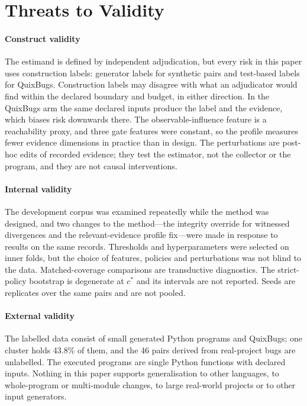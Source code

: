\section{Threats to Validity}\label{sec:threats}

\paragraph*{Construct validity} The estimand is defined by independent adjudication, but every risk in this paper uses construction labels: generator labels for synthetic pairs and test-based labels for QuixBugs. Construction labels may disagree with what an adjudicator would find within the declared boundary and budget, in either direction. In the QuixBugs arm the same declared inputs produce the label and the evidence, which biases risk downwards there. The observable-influence feature is a reachability proxy, and three gate features were constant, so the profile measures fewer evidence dimensions in practice than in design. The \ers{} perturbations are post-hoc edits of recorded evidence; they test the estimator, not the collector or the program, and they are not causal interventions.

\paragraph*{Internal validity} The development corpus was examined repeatedly while the method was designed, and two changes to the method---the integrity override for witnessed divergences and the relevant-evidence profile fix---were made in response to results on the same records. Thresholds and hyperparameters were selected on inner folds, but the choice of features, policies and perturbations was not blind to the data. Matched-coverage comparisons are transductive diagnostics. The strict-policy bootstrap is degenerate at $c^\ast$ and its intervals are not reported. Seeds are replicates over the same pairs and are not pooled.

\paragraph*{External validity} The labelled data consist of small generated Python programs and QuixBugs; one cluster holds 43.8\% of them, and the 46 pairs derived from real-project bugs are unlabelled. The executed programs are single Python functions with declared inputs. Nothing in this paper supports generalisation to other languages, to whole-program or multi-module changes, to large real-world projects or to other input generators.

